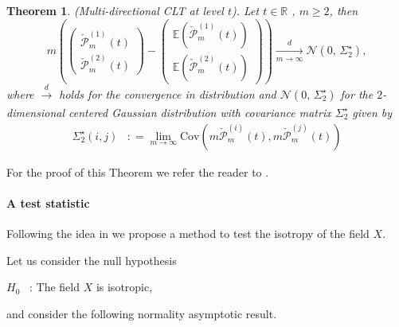\documentclass[12pt]{article}
\theoremstyle{Theorem}
\newtheorem{Theorem}{Theorem}[section]
\begin{document}
\begin{Theorem}(Multi-directional CLT at level $t$). Let $t \in \mathbb{R}$ , $m \geq 2$, then
\begin{equation*}
m\left(\begin{pmatrix} \check{\mathcal{P}}^{\scriptscriptstyle (1)}_{m}(t) \\ \check{\mathcal{P}}^{\scriptscriptstyle (2)}_{m}(t) \end{pmatrix} - \begin{pmatrix} \mathbb{E}(\check{\mathcal{P}}^{\scriptscriptstyle (1)}_{m}(t))  \\\mathbb{E}(\check{\mathcal{P}}^{\scriptscriptstyle (2)}_{m}(t)) \end{pmatrix}\right) \xrightarrow[m \to \infty]{d} \mathcal{N}\left(0,\,\Sigma_{2}^{\star}\right),
\end{equation*}
where $\xrightarrow[]{d}$ holds for the convergence in distribution and $\mathcal{N}\left(0,\,\Sigma_{2}^{\star}\right)$ for the $2$-dimensional centered Gaussian distribution with covariance matrix $\Sigma_{2}^\star$ given by
\begin{align*}
\Sigma^{\star}_{2}(i,j) & : = \lim_{m \to \infty}\text{Cov}\left(m\check{\mathcal{P}}^{\scriptscriptstyle (i)}_{m}(t), m\check{\mathcal{P}}^{\scriptscriptstyle (j)}_{m}(t) \right)
\end{align*}
\end{Theorem}
For the proof of this Theorem we refer the reader to \cite{RVY}.
\paragraph{A test statistic} Following the idea  in \cite{bierme2019}  we propose a method to test the isotropy of the field $X$.

Let us consider the null hypothesis
\begin{center}
  $H_{0}$ \, :\; The field $X$ is isotropic,
\end{center}
and consider the following normality asymptotic result.
\end{document}
